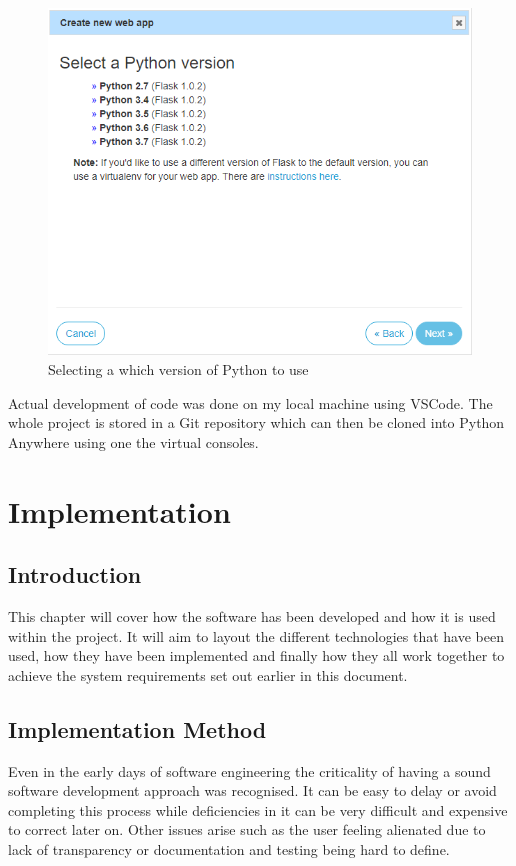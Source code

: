\documentclass[10pt,a4paper]{article}
\begin{document}
\begin{figure}[H]
\centering
  \includegraphics[width=\linewidth]{images/webapppython.png}
  \caption{Selecting a which version of Python to use}
  \label{fig:webapppython}
\end{figure}

Actual development of code was done on my local machine using VSCode. The whole project is stored in a Git repository which can then be cloned into Python Anywhere using one the virtual consoles. 

\pagebreak
\section{Implementation} 
\subsection{Introduction}
This chapter will cover how the software has been developed and how it is used within the project. It will aim to layout the different technologies that have been used, how they have been implemented and finally how they all work together to achieve the system requirements set out earlier in this document.

\subsection{Implementation Method}
Even in the early days of software engineering the criticality of having a sound software development approach was recognised. It can be easy to delay or avoid completing this process while deficiencies in it can be very difficult and expensive to correct later on. Other issues arise such as the user feeling alienated due to lack of transparency or documentation and testing being hard to define\cite{1674590}.
\end{document}
